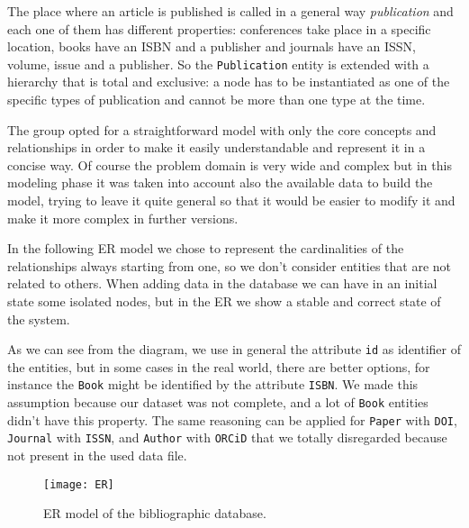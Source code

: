 The place where an article is published is called in a general way \textit{publication} and each one of them has different properties: conferences take place in a specific location, books have an ISBN and a publisher and journals have an ISSN, volume, issue and a publisher.
So the \verb|Publication| entity is extended with a hierarchy that is total and exclusive: a node has to be instantiated as one of the specific types of publication and cannot be more than one type at the time.

The group opted for a straightforward model with only the core concepts and relationships in order to make it easily understandable and represent it in a concise way.
Of course the problem domain is very wide and complex but in this modeling phase it was taken into account also the available data to build the model, trying to leave it quite general so that it would be easier to modify it and make it more complex in further versions.

In the following ER model we chose to represent the cardinalities of the relationships always starting from one, so we don't consider entities that are not related to others.
When adding data in the database we can have in an initial state some isolated nodes, but in the ER we show a stable and correct state of the system.

As we can see from the diagram, we use in general the attribute \verb|id| as identifier of the entities, but in some cases in the real world, there are better options, for instance the \verb|Book| might be identified by the attribute \verb|ISBN|.
We made this assumption because our dataset was not complete, and a lot of \verb|Book| entities didn't have this property.
The same reasoning can be applied for \verb|Paper| with \verb|DOI|, \verb|Journal| with \verb|ISSN|, and \verb|Author| with \verb|ORCiD| that we totally disregarded because not present in the used data file.
\begin{figure}[H]
    \begin{center}
        \texttt{[image: ER]}
        \caption{ER model of the bibliographic database.}
        \label{fig:er}
    \end{center}
\end{figure}

